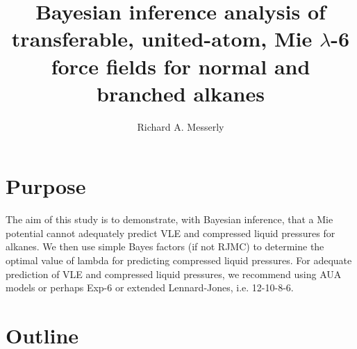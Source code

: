 \documentclass[preprint,letterpaper,floatfix,citeautoscript,aip,jcp]{revtex4-1}
\begin{document}
\title{Bayesian inference analysis of transferable, united-atom, Mie $\lambda$-6 force fields for normal and branched alkanes}

\author{Richard A. Messerly}


\begin{abstract}

\end{abstract}

\maketitle

\section*{Purpose}

The aim of this study is to demonstrate, with Bayesian inference, that a Mie potential cannot adequately predict VLE and compressed liquid pressures for alkanes. We then use simple Bayes factors (if not RJMC)  to determine the optimal value of lambda for predicting compressed liquid pressures. For adequate prediction of VLE and compressed liquid pressures, we recommend using AUA models or perhaps Exp-6 or extended Lennard-Jones, i.e. 12-10-8-6.

\section*{Outline}

\end{document}
